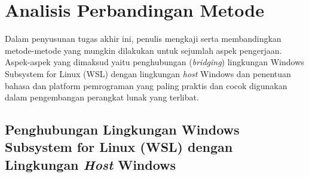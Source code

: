 
\section{Analisis Perbandingan Metode}

Dalam penyusunan tugas akhir ini, penulis mengkaji serta membandingkan metode-metode yang mungkin dilakukan untuk sejumlah aspek pengerjaan. Aspek-aspek yang dimaksud yaitu penghubungan (\textit{bridging}) lingkungan Windows Subsystem for Linux (WSL) dengan lingkungan \textit{host} Windows dan penentuan bahasa dan platform pemrograman yang paling praktis dan cocok digunakan dalam pengembangan perangkat lunak yang terlibat.

\subsection{Penghubungan Lingkungan Windows Subsystem for Linux (WSL) dengan Lingkungan \textit{Host} Windows}

